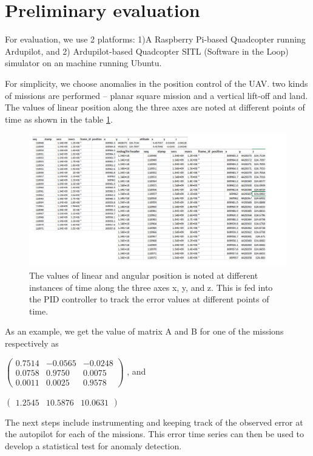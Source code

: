 \section{Preliminary evaluation}
For evaluation, we use 2 platforms: 1)A Raspberry Pi-based Quadcopter running Ardupilot, and 2) Ardupilot-based Quadcopter SITL (Software in the Loop) simulator on an machine running Ubuntu.

For simplicity, we choose anomalies in the position control of the UAV. two kinds of missions are performed -- planar square mission and a vertical lift-off and land. The values of linear position along the three axes are noted at different points of time as shown in the table \ref{fig:data}.

\begin{figure}[h!]
    \centering
    \includegraphics[width=\textwidth]{images/data.png}
    \caption{The values of linear and angular position is noted at different instances of time along the three axes x, y, and z. This is fed into the PID controller to track the error values at different points of time.}
    \label{fig:data}
\end{figure}

As an example, we get the value of matrix A and B for one of the missions respectively as

$\left({\begin{array}{ccc} 0.7514 & -0.0565 & -0.0248 \\ 0.0758 & 0.9750 & 0.0075 \\ 0.0011 & 0.0025 & 0.9578 \end{array}}\right)$ , and 

$\begin{pmatrix} 1.2545 & 10.5876 & 10.0631 \end{pmatrix}$

The next steps include instrumenting and keeping track of the observed error at the autopilot for each of the missions. This error time series can then be used to develop a statistical test for anomaly detection.  